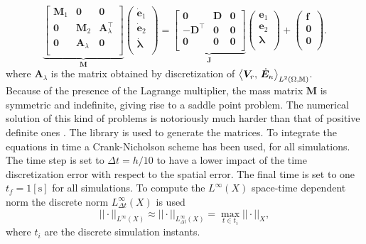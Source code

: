 \begin{equation*}
\underbrace{
	\begin{bmatrix}
	\mathbf{M}_1 & \mathbf{0} & \mathbf{0}\\
	\mathbf{0} & \mathbf{M}_2 & \mathbf{A}_\lambda^\top\\
	\mathbf{0} & \mathbf{A}_\lambda & \mathbf{0} \\
	\end{bmatrix}}_{\mathbf{M}}
\begin{pmatrix}
\dot{\mathbf{e}}_1 \\
\dot{\mathbf{e}}_2 \\
\dot{\bm{\lambda}} \\
\end{pmatrix} = 
\underbrace{
	\begin{bmatrix}
	\mathbf{0} & \mathbf{D} & \mathbf{0}\\
	-\mathbf{D}^\top & \mathbf{0} & \mathbf{0} \\
	\mathbf{0} & \mathbf{0} & \mathbf{0} \\
	\end{bmatrix}}_{\mathbf{J}}
\begin{pmatrix}
{\mathbf{e}}_1 \\
{\mathbf{e}}_2 \\
\bm{\lambda} \\
\end{pmatrix} + 
\begin{pmatrix}
\mathbf{f} \\
\mathbf{0} \\
\mathbf{0} \\
\end{pmatrix}. 
\end{equation*}
where $\mathbf{A}_\lambda$ is the matrix obtained by discretization of $\inner[L^2(\Omega, \mathbb{M})]{\bm{V}_r}{\dot{\bm{E}}_\kappa}$. \\
Because of the presence of the Lagrange multiplier, the mass matrix $\mathbf{M}$ is symmetric and indefinite, giving rise to a saddle point problem. The numerical solution of this kind of problems is notoriously much harder than that of positive definite ones \cite{benzi2005}. The {} library \cite{rathgeber2017firedrake} is used to generate the matrices. To integrate the equations in time a Crank-Nicholson scheme has been used, for all simulations. The time step is set to $\Delta t = h/10$ to have a lower impact of the time discretization error with respect to the spatial error. The final time is set to one $t_f = 1 [\textrm{s}]$ for all simulations. To compute the $L^\infty ({X})$ space-time dependent norm  the discrete norm $L^\infty_{\Delta t} ({X})$ is used
\[
||\cdot ||_{L^\infty ({X})} \approx || \cdot ||_{L^\infty_{\Delta t} ({X})} = \max_{t \in t_i} ||\cdot||_{{X}},
\]
where $t_i$ are the discrete simulation instants. 


